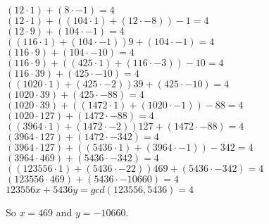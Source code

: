 
$(12 \cdot 1) + (8 \cdot -1) = 4$ \\
$(12 \cdot 1) + ((104 \cdot 1) + (12 \cdot -8)) -1 = 4$ \\
$(12 \cdot 9) + (104 \cdot -1) = 4$ \\
$((116 \cdot 1) + (104 \cdot -1)) 9 + (104 \cdot -1) = 4$ \\
$(116 \cdot 9) + (104 \cdot -10) = 4$ \\
$(116 \cdot 9) + ((425 \cdot 1) + (116 \cdot -3)) -10 = 4$ \\
$(116 \cdot 39) + (425 \cdot - 10) = 4$ \\
$((1020 \cdot 1) + (425 \cdot -2)) 39 + (425 \cdot - 10) = 4$ \\
$(1020 \cdot 39) + (425 \cdot - 88) = 4$ \\
$(1020 \cdot 39) + ((1472 \cdot 1) + (1020 \cdot -1))-88 = 4$ \\
$(1020 \cdot 127) + (1472 \cdot -88) = 4$ \\
$((3964 \cdot 1) + (1472 \cdot -2)) 127 + (1472 \cdot -88) = 4$ \\
$(3964 \cdot 127) + (1472 \cdot -342) = 4$ \\
$(3964 \cdot 127) + ((5436 \cdot 1) + (3964 \cdot -1)) -342 = 4$ \\
$(3964 \cdot 469) + (5436 \cdot -342) = 4$ \\
$((123556 \cdot 1) + (5436 \cdot -22))469 + (5436 \cdot -342) = 4$ \\
$(123556 \cdot 469) + (5436 \cdot -10660) = 4$ \\

$123556x + 5436y = gcd(123556, 5436) = 4$

So $x = 469$ and $y = -10660$.


